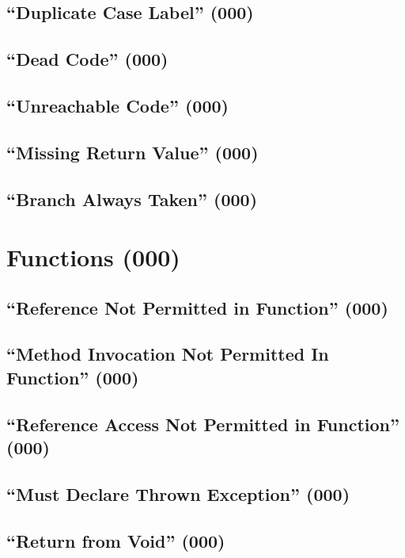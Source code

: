 \subsection{``Duplicate Case Label'' (000)}

\subsection{``Dead Code'' (000)}

\subsection{``Unreachable Code'' (000)}

\subsection{``Missing Return Value'' (000)}

\subsection{``Branch Always Taken'' (000)}

\section{Functions (000)}

\subsection{``Reference Not Permitted in Function'' (000)}

\subsection{``Method Invocation Not Permitted In Function'' (000)}

\subsection{``Reference Access Not Permitted in Function'' (000)}

\subsection{``Must Declare Thrown Exception'' (000)}

\subsection{``Return from Void'' (000)}
	
